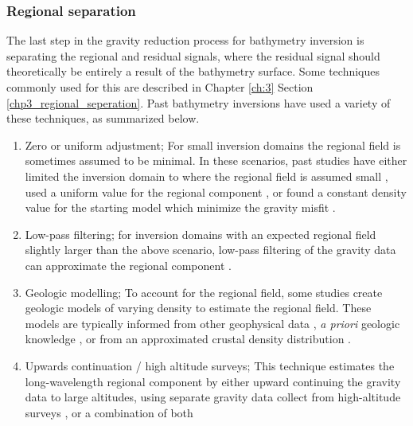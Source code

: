 \subsubsection{Regional separation}
The last step in the gravity reduction process for bathymetry inversion is separating the regional and residual signals, where the residual signal should theoretically be entirely a result of the bathymetry surface. Some techniques commonly used for this are described in Chapter \ref{ch:3} Section \ref{chp3_regional_seperation}. Past bathymetry inversions have used a variety of these techniques, as summarized below.

\begin{enumerate}
    \item Zero or uniform adjustment; For small inversion domains the regional field is sometimes assumed to be minimal. In these scenarios, past studies have either limited the inversion domain to where the regional field is assumed small \citep{cochraninversion2012, boghosianresolving2015}, used a uniform value for the regional component \citep{mutobathymetry2013}, or found a constant density value for the starting model which minimize the gravity misfit \citep{millanvulnerability2018, millanbathymetry2017, anbed2017}.
    
    \item Low-pass filtering; for inversion domains with an expected regional field slightly larger than the above scenario, low-pass filtering of the gravity data can approximate the regional component \citep{eisermannbathymetry2020, hodgsonfuture2019}. 
    
    \item Geologic modelling; To account for the regional field, some studies create geologic models of varying density to estimate the regional field. These models are typically informed from other geophysical data \citep{hodgsonfuture2019, greenbaumocean2015}, \textit{a priori} geologic knowledge \citep{tintoprogressive2011, cochranbathymetric2014, constantinoseafloor2020}, or from an approximated crustal density distribution \citep{tintoross2019, cochrandetailed2020, eisermannbathymetric2021, weigetz2020}.
    
    \item Upwards continuation / high altitude surveys; This technique estimates the long-wavelength regional component by either upward continuing the gravity data to large altitudes, using separate gravity data collect from high-altitude surveys \citep{mutosubglacial2016}, or a combination of both \citep{tintobathymetry2015}
    

\end{enumerate}
